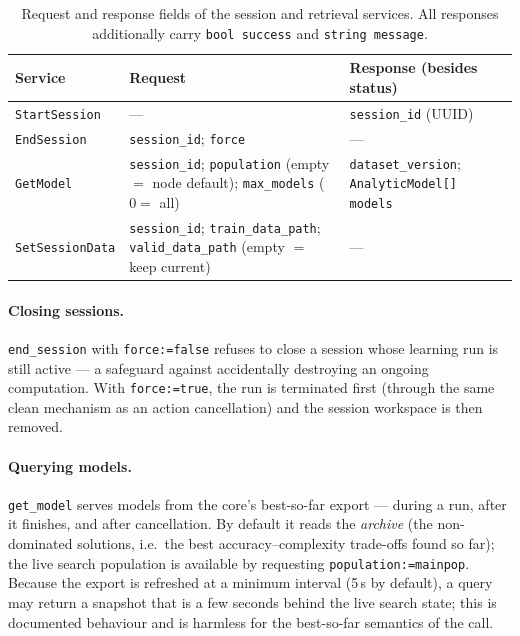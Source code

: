 \begin{table}[tb]
  \centering
  \caption{Request and response fields of the session and retrieval services.
    All responses additionally carry \texttt{bool success} and
    \texttt{string message}.}
  \label{ros2:tab:services}
  \footnotesize
  \begin{tabular}{@{}lp{5.2cm}p{4.6cm}@{}}
    \toprule
    Service & Request & Response (besides status) \\
    \midrule
    \texttt{StartSession} & --- & \texttt{session\_id} (UUID) \\
    \addlinespace
    \texttt{EndSession} & \texttt{session\_id}; \texttt{force} & --- \\
    \addlinespace
    \texttt{GetModel} & \texttt{session\_id}; \texttt{population} (empty
      $=$ node default); \texttt{max\_models} ($0=$ all) &
      \texttt{dataset\_version}; \texttt{AnalyticModel[] models} \\
    \addlinespace
    \texttt{SetSessionData} & \texttt{session\_id};
      \texttt{train\_data\_path}; \texttt{valid\_data\_path} (empty $=$
      keep current) & --- \\
    \bottomrule
  \end{tabular}
\end{table}

\paragraph{Closing sessions.} \texttt{end\_session} with
\texttt{force:=false} refuses to close a session whose learning run is still
active --- a safeguard against accidentally destroying an ongoing
computation. With \texttt{force:=true}, the run is terminated first (through
the same clean mechanism as an action cancellation) and the session workspace
is then removed.

\paragraph{Querying models.} \texttt{get\_model} serves models from the
core's best-so-far export --- during a run, after it finishes, and after
cancellation. By default it reads the \emph{archive} (the non-dominated
solutions, i.e.\ the best accuracy--complexity trade-offs found so far); the
live search population is available by requesting
\texttt{population:=mainpop}. Because the export is refreshed at a minimum
interval (5\,s by default), a query may return a snapshot that is a few
seconds behind the live search state; this is documented behaviour and is
harmless for the best-so-far semantics of the call.

